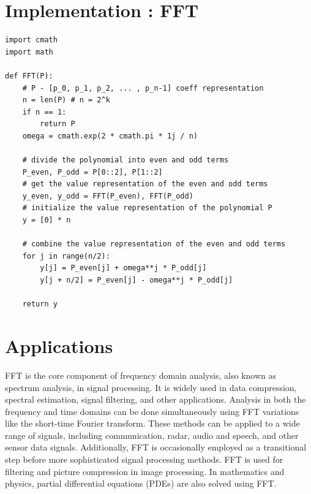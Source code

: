 \documentclass[28]{report}
\begin{document}
\chapter{Implementation : FFT}

\begin{verbatim}
import cmath
import math

def FFT(P):
	# P - [p_0, p_1, p_2, ... , p_n-1] coeff representation
	n = len(P) # n = 2^k
	if n == 1:
		return P
	omega = cmath.exp(2 * cmath.pi * 1j / n)

	# divide the polynomial into even and odd terms
	P_even, P_odd = P[0::2], P[1::2]
	# get the value representation of the even and odd terms
	y_even, y_odd = FFT(P_even), FFT(P_odd)
	# initialize the value representation of the polynomial P
	y = [0] * n

	# combine the value representation of the even and odd terms
	for j in range(n/2):
		y[j] = P_even[j] + omega**j * P_odd[j]
		y[j + n/2] = P_even[j] - omega**j * P_odd[j]

	return y
\end{verbatim}

\chapter{Applications}
FFT is the core component of frequency domain analysis, also known as spectrum analysis, in signal processing. It is widely used in data compression, spectral estimation, signal filtering, and other applications. Analysis in both the frequency and time domains can be done simultaneously using FFT variations like the short-time Fourier transform. These methods can be applied to a wide range of signals, including communication, radar, audio and speech, and other sensor data signals. Additionally, FFT is occasionally employed as a transitional step before more sophisticated signal processing methods. FFT is used for filtering and picture compression in image processing. In mathematics and physics, partial differential equations (PDEs) are also solved using FFT.
\end{document}
